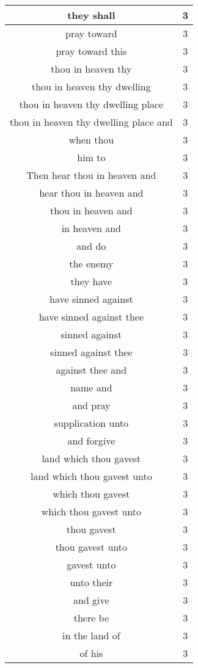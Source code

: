 \begin{center}
\begin{longtable}{|c|c|}
they shall & 3\\ \hline 
pray toward & 3\\ \hline 
pray toward this & 3\\ \hline 
thou in heaven thy & 3\\ \hline 
thou in heaven thy dwelling & 3\\ \hline 
thou in heaven thy dwelling place & 3\\ \hline 
thou in heaven thy dwelling place and & 3\\ \hline 
when thou & 3\\ \hline 
him to & 3\\ \hline 
Then hear thou in heaven and & 3\\ \hline 
hear thou in heaven and & 3\\ \hline 
thou in heaven and & 3\\ \hline 
in heaven and & 3\\ \hline 
and do & 3\\ \hline 
the enemy & 3\\ \hline 
they have & 3\\ \hline 
have sinned against & 3\\ \hline 
have sinned against thee & 3\\ \hline 
sinned against & 3\\ \hline 
sinned against thee & 3\\ \hline 
against thee and & 3\\ \hline 
name and & 3\\ \hline 
and pray & 3\\ \hline 
supplication unto & 3\\ \hline 
and forgive & 3\\ \hline 
land which thou gavest & 3\\ \hline 
land which thou gavest unto & 3\\ \hline 
which thou gavest & 3\\ \hline 
which thou gavest unto & 3\\ \hline 
thou gavest & 3\\ \hline 
thou gavest unto & 3\\ \hline 
gavest unto & 3\\ \hline 
unto their & 3\\ \hline 
and give & 3\\ \hline 
there be & 3\\ \hline 
in the land of & 3\\ \hline 
of his & 3\\ \hline 

\end{longtable}
\end{center}
